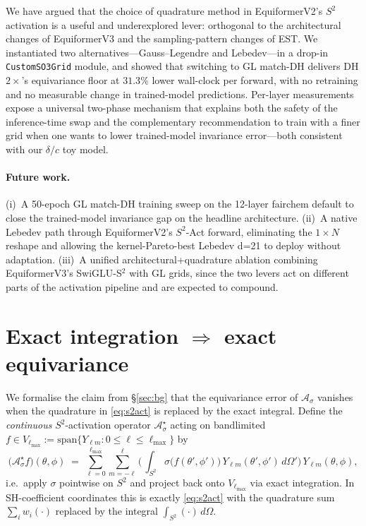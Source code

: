 \documentclass{article}
\begin{document}
We have argued that the choice of quadrature method in EquiformerV2's
$S^2$ activation is a useful and underexplored lever: orthogonal to
the architectural changes of EquiformerV3 and the sampling-pattern
changes of EST. We instantiated two alternatives---Gauss--Legendre
and Lebedev---in a drop-in \texttt{CustomSO3Grid} module, and showed
that switching to GL match-DH delivers DH $2\times$'s equivariance
floor at $31.3\%$ lower wall-clock per forward, with no retraining
and no measurable change in trained-model predictions. Per-layer
measurements expose a universal two-phase mechanism that explains
both the safety of the inference-time swap and the complementary
recommendation to train with a finer grid when one wants to lower
trained-model invariance error---both consistent with our
$\delta/c$ toy model.

\paragraph{Future work.}
(i)~A 50-epoch GL match-DH training sweep on the 12-layer fairchem
default to close the trained-model invariance gap on the headline
architecture. (ii)~A native Lebedev path through EquiformerV2's
$S^2$-Act forward, eliminating the $1\!\times\!N$ reshape and
allowing the kernel-Pareto-best Lebedev d=21 to deploy without
adaptation. (iii)~A unified architectural+quadrature ablation
combining EquiformerV3's SwiGLU-S$^2$ with GL grids, since the two
levers act on different parts of the activation pipeline and are
expected to compound.




\appendix

\section{\texorpdfstring{Exact integration $\Rightarrow$ exact equivariance}{Exact integration implies exact equivariance}}
\label{app:exact-equivariance}

We formalise the claim from \S\ref{sec:bg} that the equivariance error
of $\mathcal{A}_\sigma$ vanishes when the quadrature in
\eqref{eq:s2act} is replaced by the exact integral. Define the
\emph{continuous} $S^2$-activation operator
$\mathcal{A}^{\star}_\sigma$ acting on bandlimited
$f \in V_{\ell_{\max}} := \mathrm{span}\{Y_{\ell m} : 0 \leq \ell
\leq \ell_{\max}\}$ by
\begin{equation}
  \bigl(\mathcal{A}^{\star}_\sigma f\bigr)(\theta, \phi)
  \;=\;
  \sum_{\ell=0}^{\ell_{\max}} \sum_{m=-\ell}^{\ell}
  \biggl(\,
    \int_{S^2} \sigma\!\bigl(f(\theta', \phi')\bigr)\,
                 Y_{\ell m}(\theta', \phi')\, d\Omega'
  \biggr)\,
  Y_{\ell m}(\theta, \phi),
  \label{eq:exact-op}
\end{equation}
i.e.\ apply $\sigma$ pointwise on $S^2$ and project back onto
$V_{\ell_{\max}}$ via exact integration. In SH-coefficient
coordinates this is exactly \eqref{eq:s2act} with the quadrature sum
$\sum_i w_i (\cdot)$ replaced by the integral
$\int_{S^2} (\cdot)\,d\Omega$.
\end{document}
